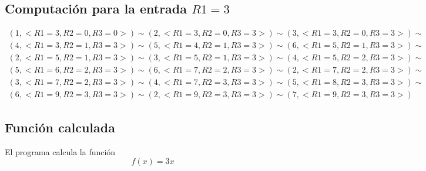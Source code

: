 	\subsection{Computación para la entrada $R1=3$}
	\begin{equation*}\begin{gathered}
	(1, <R1=3, R2=0, R3=0>) \sim (2, <R1=3, R2=0, R3=3>) \sim (3, <R1=3, R2=0, R3=3>) \sim\\
	(4, <R1=3, R2=1, R3=3>) \sim (5, <R1=4, R2=1, R3=3>) \sim (6, <R1=5, R2=1, R3=3>) \sim\\
	(2, <R1=5, R2=1, R3=3>) \sim (3, <R1=5, R2=1, R3=3>) \sim (4, <R1=5, R2=2, R3=3>) \sim\\
	(5, <R1=6, R2=2, R3=3>) \sim (6, <R1=7, R2=2, R3=3>) \sim (2, <R1=7, R2=2, R3=3>) \sim\\
	(3, <R1=7, R2=2, R3=3>) \sim (4, <R1=7, R2=3, R3=3>) \sim (5, <R1=8, R2=3, R3=3>) \sim\\
	(6, <R1=9, R2=3, R3=3>) \sim (2, <R1=9, R2=3, R3=3>) \sim (7, <R1=9, R2=3, R3=3>)
	\end{gathered}\end{equation*}
	\subsection{Función calculada}
	El programa calcula la función
	\begin{equation*}
		f(x)=3x
	\end{equation*}
